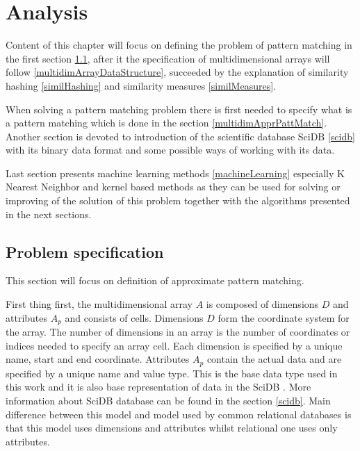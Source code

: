 \chapter{Analysis} \label{analysis}
Content of this chapter will focus on defining the problem of pattern matching in the first section \ref{spec}, after it the specification of multidimensional arrays will follow \ref{multidimArrayDataStructure}, succeeded by the explanation of similarity hashing \ref{similHashing} and similarity measures \ref{similMeasures}. 

When solving a pattern matching problem there is first needed to specify what is a pattern matching which is done in the section 
\ref{multidimApprPattMatch}. Another section is devoted to introduction of the scientific database SciDB \ref{scidb} with its binary data format and some possible ways of working with its data.

Last section presents machine learning methods \ref{machineLearning} especially K Nearest Neighbor and kernel based methods as they can be used for solving or improving of the solution of this problem together with the algorithms presented in the next sections.
\section{Problem specification} \label{spec}
This section will focus on definition of approximate pattern matching. 

First thing first,
the multidimensional array $A$ is composed of dimensions $D$ and attributes $A_p$ and consists of cells. Dimensions $D$ form the coordinate system for the array. The number of dimensions in an array is the number of coordinates or indices needed to specify an array cell. Each dimension is specified by a unique name, start and end coordinate. Attributes $A_p$ contain the actual data and are specified by a unique name and value type. This is the base data type used in this work and it is also base representation of data in the SciDB \cite{scidb}. More information about SciDB database can be found in the section \ref{scidb}. Main difference between this model and model used by common relational databases is that this model uses dimensions and attributes whilst relational one uses only attributes.

